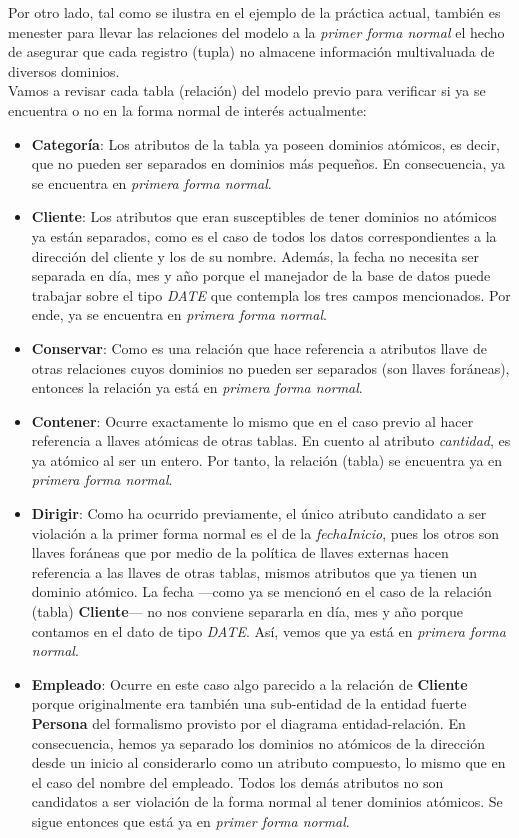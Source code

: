 \documentclass[11pt,letterpaper]{article}
\begin{document}
Por otro lado, tal como se ilustra en el ejemplo de la práctica actual, también es menester para llevar las relaciones del modelo a la \textit{primer forma normal} el hecho de asegurar que cada registro (tupla) no almacene información multivaluada de diversos dominios.\\

Vamos a revisar cada tabla (relación) del modelo previo para verificar si ya se encuentra o no en la forma normal de interés actualmente:

\begin{itemize}
\item \textbf{Categoría}: Los atributos de la tabla ya poseen dominios atómicos, es decir, que no pueden ser separados en dominios más pequeños. En consecuencia, ya se encuentra en \textit{primera forma normal}.
\item \textbf{Cliente}: Los atributos que eran susceptibles de tener dominios no atómicos ya están separados, como es el caso de todos los datos correspondientes a la dirección del cliente y los de su nombre. Además, la fecha no necesita ser separada en día, mes y año porque el manejador de la base de datos puede trabajar sobre el tipo \textit{DATE} que contempla los tres campos mencionados. Por ende, ya se encuentra en \textit{primera forma normal}.
\item \textbf{Conservar}: Como es una relación que hace referencia a atributos llave de otras relaciones cuyos dominios no pueden ser separados (son llaves foráneas), entonces la relación ya está en \textit{primera forma normal}.
\item \textbf{Contener}: Ocurre exactamente lo mismo que en el caso previo al hacer referencia a llaves atómicas de otras tablas. En cuento al atributo \textit{cantidad}, es ya atómico al ser un entero. Por tanto, la relación (tabla) se encuentra ya en \textit{primera forma normal}.
\item \textbf{Dirigir}: Como ha ocurrido previamente, el único atributo candidato a ser violación a la primer forma normal es el de la \textit{fechaInicio}, pues los otros son llaves foráneas que por medio de la política de llaves externas hacen referencia a las llaves de otras tablas, mismos atributos que ya tienen un dominio atómico. La fecha ---como ya se mencionó en el caso de la relación (tabla) \textbf{Cliente}--- no nos conviene separarla en día, mes y año porque contamos en el dato de tipo \textit{DATE}. Así, vemos que ya está en \textit{primera forma normal}.
\item \textbf{Empleado}: Ocurre en este caso algo parecido a la relación de \textbf{Cliente} porque originalmente era también una sub-entidad de la entidad fuerte \textbf{Persona} del formalismo provisto por el diagrama entidad-relación. En consecuencia, hemos ya separado los dominios no atómicos de la dirección desde un inicio al considerarlo como un atributo compuesto, lo mismo que en el caso del nombre del empleado. Todos los demás atributos no son candidatos a ser violación de la forma normal al tener dominios atómicos. Se sigue entonces que está ya en \textit{primer forma normal}.


\end{itemize}
\end{document}

